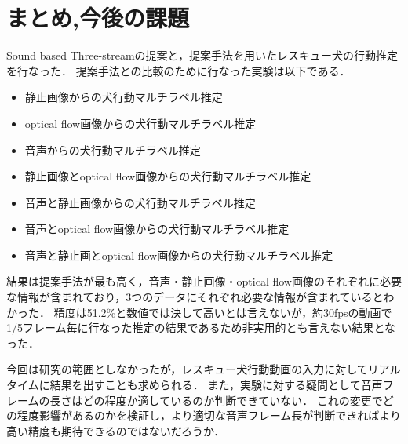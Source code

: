\chapter{まとめ,今後の課題}
Sound based Three-streamの提案と，提案手法を用いたレスキュー犬の行動推定を行なった．
提案手法との比較のために行なった実験は以下である．
\begin{itemize}
  \item 静止画像からの犬行動マルチラベル推定
  \item optical flow画像からの犬行動マルチラベル推定
  \item 音声からの犬行動マルチラベル推定
  \item 静止画像とoptical flow画像からの犬行動マルチラベル推定
  \item 音声と静止画像からの犬行動マルチラベル推定
  \item 音声とoptical flow画像からの犬行動マルチラベル推定
  \item 音声と静止画とoptical flow画像からの犬行動マルチラベル推定
\end{itemize}
結果は提案手法が最も高く，音声・静止画像・optical flow画像のそれぞれに必要な情報が含まれており，3つのデータにそれぞれ必要な情報が含まれているとわかった．
精度は51.2\%と数値では決して高いとは言えないが，約30fpsの動画で1/5フレーム毎に行なった推定の結果であるため非実用的とも言えない結果となった．

今回は研究の範囲としなかったが，レスキュー犬行動動画の入力に対してリアルタイムに結果を出すことも求められる．
また，実験に対する疑問として音声フレームの長さはどの程度か適しているのか判断できていない．
これの変更でどの程度影響があるのかを検証し，より適切な音声フレーム長が判断できればより高い精度も期待できるのではないだろうか．

%


% 
% 


